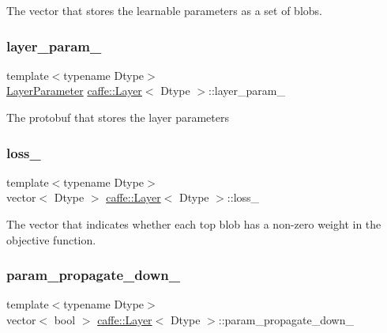 The vector that stores the learnable parameters as a set of blobs. \mbox{\label{classcaffe_1_1_layer_a7ed12bb2df25c887e41d7ea9557fc701}} 
\subsubsection{\texorpdfstring{layer\+\_\+param\+\_\+}{layer\_param\_}}
{\footnotesize\ttfamily template$<$typename Dtype$>$ \\
\mbox{\hyperlink{classcaffe_1_1_layer_parameter}{Layer\+Parameter}} \mbox{\hyperlink{classcaffe_1_1_layer}{caffe\+::\+Layer}}$<$ Dtype $>$\+::layer\+\_\+param\+\_\+\hspace{0.3cm}{\ttfamily [protected]}}

The protobuf that stores the layer parameters \mbox{\label{classcaffe_1_1_layer_a5fbf5ce7385b2da3d8edc7eec3822ac7}} 
\subsubsection{\texorpdfstring{loss\+\_\+}{loss\_}}
{\footnotesize\ttfamily template$<$typename Dtype$>$ \\
vector$<$ Dtype $>$ \mbox{\hyperlink{classcaffe_1_1_layer}{caffe\+::\+Layer}}$<$ Dtype $>$\+::loss\+\_\+\hspace{0.3cm}{\ttfamily [protected]}}

The vector that indicates whether each top blob has a non-\/zero weight in the objective function. \mbox{\label{classcaffe_1_1_layer_ab1db6c32fa71343dac868b07288eb45e}} 
\subsubsection{\texorpdfstring{param\+\_\+propagate\+\_\+down\+\_\+}{param\_propagate\_down\_}}
{\footnotesize\ttfamily template$<$typename Dtype$>$ \\
vector$<$ bool $>$ \mbox{\hyperlink{classcaffe_1_1_layer}{caffe\+::\+Layer}}$<$ Dtype $>$\+::param\+\_\+propagate\+\_\+down\+\_\+\hspace{0.3cm}{\ttfamily [protected]}}

